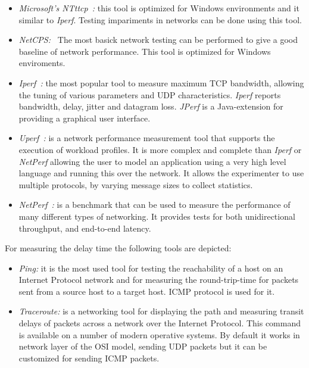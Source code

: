 \begin{itemize}
\item \emph{Microsoft's
    NTttcp~\cite{Microsoft2013}:}
  this tool is optimized for Windows environments and it similar to
  \emph{Iperf}. Testing impariments in networks can be done using this tool.
\item \emph{NetCPS:~\cite{Aase1998}} The most basick network testing can be performed to give a
  good baseline of network performance. This tool is optimized for Windows
  enviroments.
\item \emph{Iperf~\cite{Iperf2014}:} the most popular tool to measure maximum \ac{TCP} bandwidth, allowing the
  tuning of various parameters and \ac{UDP} characteristics. \emph{Iperf} reports
  bandwidth, delay, jitter and datagram loss. \emph{JPerf} is a Java-extension for
  providing a graphical user interface.
\item \emph{Uperf~\cite{Microsystems2013}:} is a network
  performance measurement tool that supports the execution of workload profiles. It
  is more complex and complete than \emph{Iperf} or \emph{NetPerf} allowing the user to model
  an application using a very high level language and running this over the
  network. It allows the experimenter to use multiple protocols, by varying message sizes to
  collect statistics.
\item \emph{NetPerf~\cite{Company2012}:} is a benchmark that can be used to measure the performance of many different types of networking. It provides tests for both unidirectional throughput, and end-to-end latency.
\end{itemize}

For measuring the delay time the following tools are depicted:
\begin{itemize}
\item \emph{Ping:} it is the most used tool for testing the reachability of a host on an
  Internet Protocol network and for measuring the round-trip-time for packets sent
  from a source host to a target host. \ac{ICMP} protocol is used for it.
\item \emph{Traceroute:} is a networking tool for displaying the path and
  measuring transit delays of packets across a network over the Internet
  Protocol. This command is available on a number of modern operative systems. By
  default it works in network layer of the \acs{OSI} model, sending \ac{UDP} packets but it can be customized
  for sending \ac{ICMP} packets.
\end{itemize}

